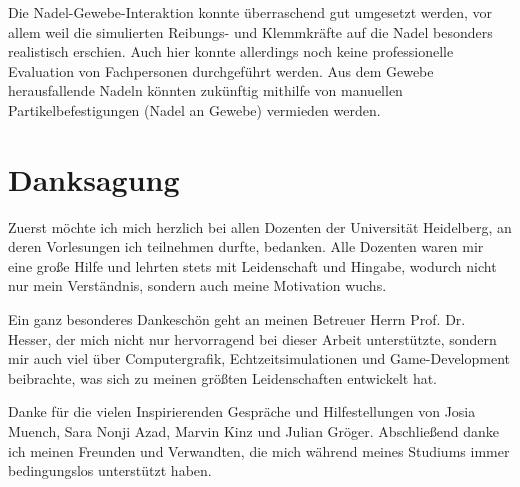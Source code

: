Die Nadel-Gewebe-Interaktion konnte überraschend gut umgesetzt werden, vor allem weil die simulierten Reibungs- und Klemmkräfte auf die Nadel besonders realistisch erschien. Auch hier konnte allerdings noch keine professionelle Evaluation von Fachpersonen durchgeführt werden.
Aus dem Gewebe herausfallende Nadeln könnten zukünftig mithilfe von manuellen Partikelbefestigungen (Nadel an Gewebe) vermieden werden.










\chapter*{Danksagung}
Zuerst möchte ich mich herzlich bei allen Dozenten der Universität Heidelberg, an deren Vorlesungen ich teilnehmen durfte, bedanken. Alle Dozenten waren mir eine große Hilfe und lehrten stets mit Leidenschaft und Hingabe, wodurch nicht nur mein Verständnis, sondern auch meine Motivation wuchs.

Ein ganz besonderes Dankeschön geht an meinen Betreuer Herrn Prof. Dr. Hesser, der mich nicht nur hervorragend bei dieser Arbeit unterstützte, sondern mir auch viel über Computergrafik, Echtzeitsimulationen und Game-Development beibrachte, was sich zu meinen größten Leidenschaften entwickelt hat.

Danke für die vielen Inspirierenden Gespräche und Hilfestellungen von Josia Muench, Sara Nonji Azad, Marvin Kinz und Julian Gröger. Abschließend danke ich meinen Freunden und Verwandten, die mich während meines Studiums immer bedingungslos unterstützt haben.
